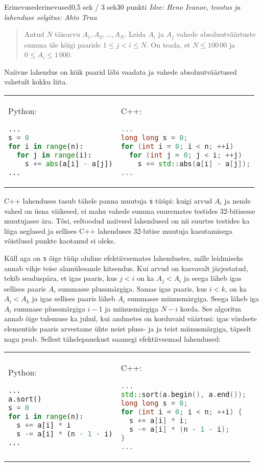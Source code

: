 \begin{yl}{3}{Erinevused}{erinevused}{0,5 sek / 3 sek}{30 punkti}
  \emph{Idee: Heno Ivanov, teostus ja lahenduse selgitus: Ahto Truu}

  \begin{quote}
    Antud $N$ täisarvu $A_1, A_2, \ldots, A_N$. Leida $A_i$ ja $A_j$ vahede absoluutväärtuste summa üle kõigi paaride $1 \le j < i \le N$. On teada, et $N \le 100\,00$ ja $0 \le A_i \le 1\,000$.
  \end{quote}

Naiivne lahendus on kõik paarid läbi vaadata ja vahede absoluutväärtused vahetult kokku liita.

\begin{tabular}{p{\colwidth} p{\colwidth}}
Python:
\begin{lstlisting}[language=Python]
...
s = 0
for i in range(n):
  for j in range(i):
    s += abs(a[i] - a[j])
...
\end{lstlisting}
&
C++:
\begin{lstlisting}[language=C++]
...
long long s = 0;
for (int i = 0; i < n; ++i)
  for (int j = 0; j < i; ++j)
    s += std::abs(a[i] - a[j]);
...
\end{lstlisting}
\end{tabular}

C++ lahenduses tasub tähele panna muutuja \lstinline[language=C++]|s| tüüpi: kuigi arvud $A_i$ ja nende vahed on üsna väikesed, ei mahu vahede summa suuremates testides 32-bitisesse muutujasse ära. Tõsi, eeltoodud naiivsed lahendused on nii suurtes testides ka liiga aeglased ja sellises C++ lahenduses 32-bitise muutuja kasutamisega võistlusel punkte kaotanud ei oleks.

Küll aga on \lstinline[language=C++]|s| õige tüüp oluline efektiivsemates lahendustes, mille leidmiseks annab vihje teise alamülesande kitsendus. Kui arvud on kasvavalt järjestatud, tekib seaduspära, et igas paaris, kus $j < i$ on ka $A_j < A_i$ ja seega läheb igas sellises paaris $A_i$ summasse plussmärgiga. Samas igas paaris, kus $i < k$, on ka $A_i < A_k$ ja igas sellises paaris läheb $A_i$ summasse miinusmärgiga. Seega läheb iga $A_i$ summase plussmärgiga $i - 1$ ja miinusmärgiga $N - i$ korda. See algoritm annab õige tulemuse ka juhul, kui andmetes on korduvaid väärtusi: igas võrdsete elementide paaris arvestame ühte neist pluss- ja ja teist miinusmärgiga, täpselt nagu peab. Sellest tähelepanekust saamegi efektiivsemad lahendused:

\begin{tabular}{p{\colwidth} p{\colwidth}}
Python:
\begin{lstlisting}[language=Python]
...
a.sort()
s = 0
for i in range(n):
  s += a[i] * i
  s -= a[i] * (n - 1 - i)
...
\end{lstlisting}
&
C++:
\begin{lstlisting}[language=C++]
...
std::sort(a.begin(), a.end());
long long s = 0;
for (int i = 0; i < n; ++i) {
  s += a[i] * i;
  s -= a[i] * (n - 1 - i);
}
...
\end{lstlisting}
\end{tabular}


\end{yl}
